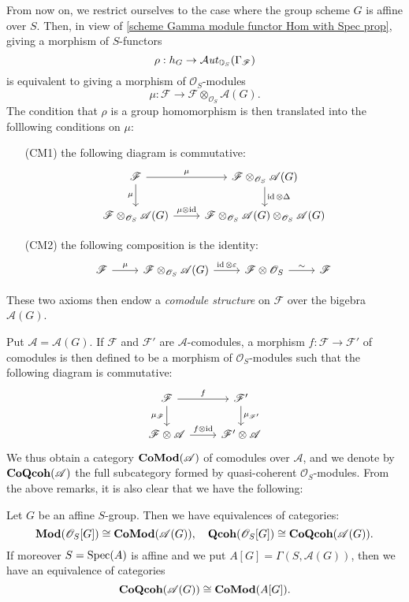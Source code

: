 From now on, we restrict ourselves to the case where the group scheme $G$ is affine over $S$. Then, in view of \cref{scheme Gamma module functor Hom with Spec prop}, giving a morphism of $S$-functors
\[\rho:h_G\to\operatorname{\mathcal{A}\hspace*{-0.2pt}\textit{ut}\hspace{0.5pt}}_{\mathbb{O}_S}(\Gamma_\mathscr{F})\]
is equivalent to giving a morphism of $\mathscr{O}_S$-modules
\[\mu:\mathscr{F}\to\mathscr{F}\otimes_{\mathscr{O}_S}\mathscr{A}(G).\]
The condition that $\rho$ is a group homomorphism is then translated into the folllowing conditions on $\mu$:
\begin{enumerate}[leftmargin=40pt]
    \item[(CM1)] the following diagram is commutative:
    \[\begin{tikzcd}
    \mathscr{F}\ar[r,"\mu"]\ar[d,swap,"\mu"]&\mathscr{F}\otimes_{\mathscr{O}_S}\mathscr{A}(G)\ar[d,"\id\otimes\Delta"]\\
    \mathscr{F}\otimes_{\mathscr{O}_S}\mathscr{A}(G)\ar[r,"\mu\otimes\id"]&\mathscr{F}\otimes_{\mathscr{O}_S}\mathscr{A}(G)\otimes_{\mathscr{O}_S}\mathscr{A}(G)
    \end{tikzcd}\]
    \item[(CM2)] the following composition is the identity:
    \[\begin{tikzcd}
    \mathscr{F}\ar[r,"\mu"]&\mathscr{F}\otimes_{\mathscr{O}_S}\mathscr{A}(G)\ar[r,"\id\otimes\eps"]&\mathscr{F}\otimes\mathscr{O}_S\ar[r,"\sim"]&\mathscr{F}
    \end{tikzcd}\]
\end{enumerate}
These two axioms then endow a \textit{comodule structure} on $\mathscr{F}$ over the bigebra $\mathscr{A}(G)$.\par
Put $\mathscr{A}=\mathscr{A}(G)$. If $\mathscr{F}$ and $\mathscr{F}'$ are $\mathscr{A}$-comodules, a morphism $f:\mathscr{F}\to\mathscr{F}'$ of comodules is then defined to be a morphism of $\mathscr{O}_S$-modules such that the following diagram is commutative:
\[\begin{tikzcd}
\mathscr{F}\ar[r,"f"]\ar[d,swap,"\mu_{\mathscr{F}}"]&\mathscr{F}'\ar[d,"\mu_{\mathscr{F}'}"]\\
\mathscr{F}\otimes\mathscr{A}\ar[r,"f\otimes\id"]&\mathscr{F}'\otimes\mathscr{A}
\end{tikzcd}\]
We thus obtain a category $\mathbf{CoMod}(\mathscr{A})$ of comodules over $\mathscr{A}$, and we denote by $\mathbf{CoQcoh}(\mathscr{A})$ the full subcategory formed by quasi-coherent $\mathscr{O}_S$-modules. From the above remarks, it is also clear that we have the following:
\begin{proposition}\label{scheme module over affine group cat equivalence}
Let $G$ be an affine $S$-group. Then we have equivalences of categories:
\[\mathbf{Mod}(\mathscr{O}_S[G])\cong\mathbf{CoMod}(\mathscr{A}(G)),\quad \mathbf{Qcoh}(\mathscr{O}_S[G])\cong\mathbf{CoQcoh}(\mathscr{A}(G)).\]
If moreover $S=\mathrm{Spec}(A)$ is affine and we put $A[G]=\Gamma(S,\mathscr{A}(G))$, then we have an equivalence of categories
\[\mathbf{CoQcoh}(\mathscr{A}(G))\cong\mathbf{CoMod}(A[G]).\]
\end{proposition}

